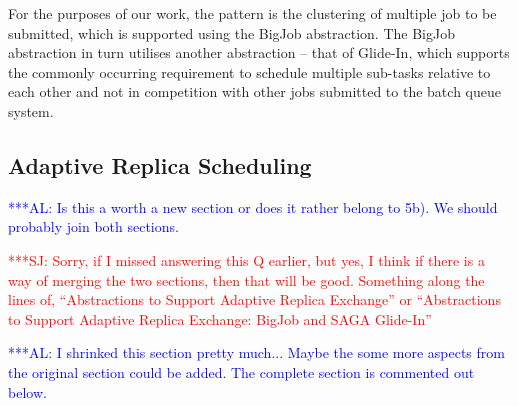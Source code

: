 \documentclass{rspublic}
\newcommand{\alnote}[1]{ {\textcolor{blue} { ***AL: #1 }}}
\newcommand{\jhanote}[1]{ {\textcolor{red} { ***SJ: #1 }}}
\newcommand{\alnote}[1]{}
\newcommand{\jhanote}[1]{}
\begin{document}
For the purposes of our work, the pattern is the clustering of
multiple job to be submitted, which is supported using the BigJob
abstraction. The BigJob abstraction in turn utilises another
abstraction -- that of Glide-In, which supports the commonly occurring
requirement to schedule multiple sub-tasks relative to each other and
not in competition with other jobs submitted to the batch queue
system.
                         


   
\subsection{Adaptive Replica Scheduling}
\label{sec:adaptivitiy}    
\alnote{Is this a worth a new section or does it rather belong to
  5b). We should probably join both sections.}  

\jhanote{Sorry, if I missed answering this Q earlier, but yes, I think
  if there is a way of merging the two sections, then that will be
  good. Something along the lines of, ``Abstractions to Support
  Adaptive Replica Exchange'' or ``Abstractions to Support Adaptive
  Replica Exchange: BigJob and SAGA Glide-In''}

\alnote{I shrinked this section pretty much... Maybe the some more
    aspects from the original section could be added. The complete
    section is commented out below.}
\end{document}
